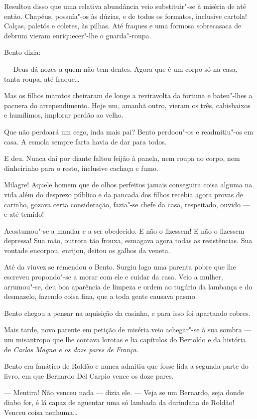 Resultou disso que uma relativa abundância veio substituir"-se à miséria
de até então. Chapéus, possuía"-os às dúzias, e de todos os formatos,
inclusive cartola! Calças, paletós e coletes, às pilhas. Até fraques e
uma formosa sobrecasaca de debrum vieram enriquecer"-lhe o guarda"-roupa.

Bento dizia:

--- Deus dá nozes a quem não tem dentes. Agora que é um corpo só na
casa, tanta roupa, até fraque\ldots{}

Mas os filhos marotos cheiraram de longe a reviravolta da fortuna e
bateu"-lhes a pacuera do arrependimento. Hoje um, amanhã outro, vieram os
três, cabisbaixos e humílimos, implorar perdão ao velho.

Que não perdoará um cego, inda mais pai? Bento perdoou"-os e readmitiu"-os
em casa. A esmola sempre farta havia de dar para todos.

E deu. Nunca daí por diante faltou feijão à panela, nem roupa ao corpo,
nem dinheirinho para o resto, inclusive cachaça e fumo.

Milagre! Aquele homem que de olhos perfeitos jamais conseguira coisa
alguma na vida além do desprezo público e da pancada dos filhos recebia
agora provas de carinho, gozava certa consideração, fazia"-se chefe da
casa, respeitado, ouvido --- e até temido!

Acostumou"-se a mandar e a ser obedecido. E não o fizessem! E não o
fizessem depressa! Sua mão, outrora tão frouxa, esmagava agora todas as
resistências. Sua vontade encorpou, enrijou, deitou os galhos da veneta.

Até da viuvez se remendou o Bento. Surgiu logo uma parenta pobre que lhe
escreveu propondo"-se a morar com ele e cuidar da casa. Veio a mulher,
arrumou"-se, deu boa aparência de limpeza e ordem ao tugúrio da lambança
e do desmazelo, fazendo coisa fina, que a toda gente causava pasmo.

Bento chegou a pensar na aquisição da casinha, e para isso foi apartando
cobres.

Mais tarde, novo parente em petição de miséria veio achegar"-se à sua
sombra --- um misantropo que lhe contava lorotas e lia capítulos do
Bertoldo e da história de \emph{Carlos Magno e os doze pares de França.}

Bento era fanático de Roldão e nunca admitiu que fosse lida a segunda
parte do livro, em que Bernardo Del Carpio vence os doze pares.

--- Mentira! Não venceu nada --- dizia ele. --- Veja se um Bernardo,
seja donde diabo for, é lá capaz de aguentar uma só lambada da durindana
de Roldão! Venceu coisa nenhuma\ldots{}

